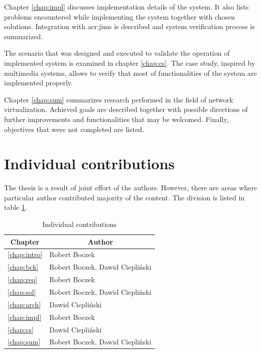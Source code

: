 \documentclass[11pt,openany]{book}
\begin{document}
      Chapter \ref{chap:impl} discusses implementation details of the system. It also lists problems encountered while
      implementing the system together with chosen solutions. Integration with \gls{acr:jims} is described and system
      verification process is summarized.

      The scenario that was designed and executed to validate the operation of implemented system is examined in chapter
      \ref{chap:cs}. The case study, inspired by multimedia systems, allows to verify that most of functionalities of the
      system are implemented properly.

      Chapter \ref{chap:sum} summarizes research performed in the field of network virtualization. Achieved goals are
      described together with possible directions of further improvements and functionalities that may be welcomed.
      Finally, objectives that were not completed are listed.
      

    \section{Individual contributions}

      The thesis is a result of joint effort of the authors. However, there are areas where particular author
      contributed majority of the content. The division is listed in table \ref{tab:intro:contrib}.

      \newcommand{\compref}[1]{\ref{#1} \nameref{#1}}

      \begin{table}[h]
        \centering

        \begin{tabular}{|l|l|}
          \hline
          \multicolumn{1}{|c|}{Chapter} & \multicolumn{1}{c|}{Author}     \\
          \hline \hline
          \compref{chap:intro}          & Robert Boczek                   \\
          \hline
          \compref{chap:bck}            & Robert Boczek, Dawid Ciepliński \\
          \hline
          \compref{chap:req}            & Robert Boczek                   \\
          \hline
          \compref{chap:sol}            & Robert Boczek, Dawid Ciepliński \\
          \hline
          \compref{chap:arch}           & Dawid Ciepliński                \\
          \hline
          \compref{chap:impl}           & Robert Boczek                   \\
          \hline
          \compref{chap:cs}             & Dawid Ciepliński                \\
          \hline
          \compref{chap:sum}            & Robert Boczek, Dawid Ciepliński \\
          \hline
        \end{tabular}

        \caption{Individual contributions}
        \label{tab:intro:contrib}
      \end{table}
\end{document}
